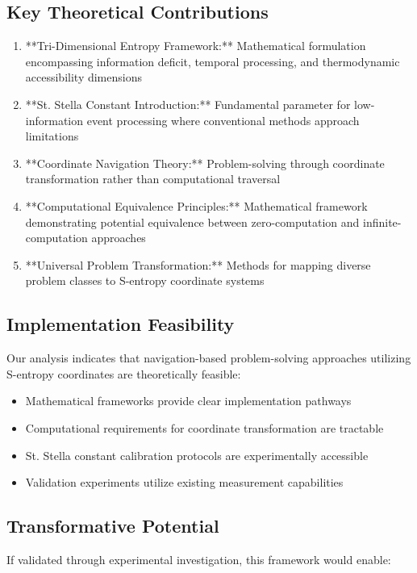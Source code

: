 \documentclass[11pt]{article}
\begin{document}
\subsection{Key Theoretical Contributions}

\begin{enumerate}
\item **Tri-Dimensional Entropy Framework:** Mathematical formulation encompassing information deficit, temporal processing, and thermodynamic accessibility dimensions
\item **St. Stella Constant Introduction:** Fundamental parameter for low-information event processing where conventional methods approach limitations
\item **Coordinate Navigation Theory:** Problem-solving through coordinate transformation rather than computational traversal
\item **Computational Equivalence Principles:** Mathematical framework demonstrating potential equivalence between zero-computation and infinite-computation approaches
\item **Universal Problem Transformation:** Methods for mapping diverse problem classes to S-entropy coordinate systems
\end{enumerate}

\subsection{Implementation Feasibility}

Our analysis indicates that navigation-based problem-solving approaches utilizing S-entropy coordinates are theoretically feasible:

\begin{itemize}
\item Mathematical frameworks provide clear implementation pathways
\item Computational requirements for coordinate transformation are tractable
\item St. Stella constant calibration protocols are experimentally accessible
\item Validation experiments utilize existing measurement capabilities
\end{itemize}

\subsection{Transformative Potential}

If validated through experimental investigation, this framework would enable:
\end{document}
